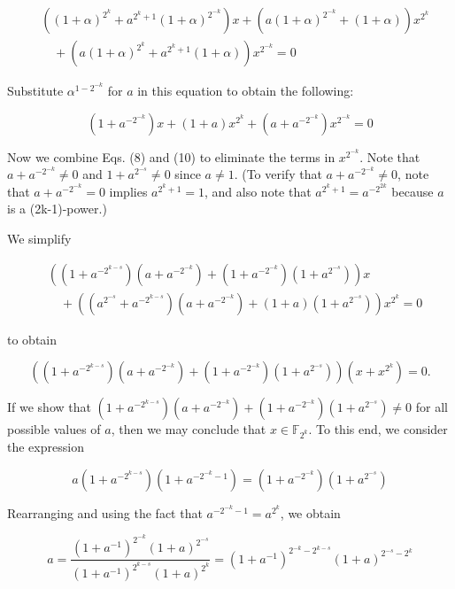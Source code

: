 \documentclass[10pt]{article}
\begin{document}
$$
\begin{aligned}
& \left((1+\alpha)^{2^{k}}+a^{2^{k}+1}(1+\alpha)^{2^{-k}}\right) x+\left(a(1+\alpha)^{2^{-k}}+(1+\alpha)\right) x^{2^{k}} \\
& \quad+\left(a(1+\alpha)^{2^{k}}+a^{2^{k}+1}(1+\alpha)\right) x^{2^{-k}}=0
\end{aligned}
$$

Substitute $\alpha^{1-2^{-k}}$ for $a$ in this equation to obtain the following:


\begin{equation*}
\left(1+a^{-2^{-k}}\right) x+(1+a) x^{2^{k}}+\left(a+a^{-2^{-k}}\right) x^{2^{-k}}=0 \tag{10}
\end{equation*}


Now we combine Eqs. (8) and (10) to eliminate the terms in $x^{2^{-k}}$. Note that $a+a^{-2^{-k}} \neq 0$ and $1+a^{2^{-s}} \neq 0$ since $a \neq 1$. (To verify that $a+a^{-2^{-k}} \neq 0$, note that $a+a^{-2^{-k}}=0$ implies $a^{2^{k}+1}=1$, and also note that $a^{2^{k}+1}=a^{-2^{2 k}}$ because $a$ is a (2k-1)-power.)

We simplify

$$
\begin{aligned}
& \left(\left(1+a^{-2^{k-s}}\right)\left(a+a^{-2^{-k}}\right)+\left(1+a^{-2^{-k}}\right)\left(1+a^{2^{-s}}\right)\right) x \\
& \quad+\left(\left(a^{2^{-s}}+a^{-2^{k-s}}\right)\left(a+a^{-2^{-k}}\right)+(1+a)\left(1+a^{2^{-s}}\right)\right) x^{2^{k}}=0
\end{aligned}
$$

to obtain

$$
\left(\left(1+a^{-2^{k-s}}\right)\left(a+a^{-2^{-k}}\right)+\left(1+a^{-2^{-k}}\right)\left(1+a^{2^{-s}}\right)\right)\left(x+x^{2^{k}}\right)=0 .
$$

If we show that $\left(1+a^{-2^{k-s}}\right)\left(a+a^{-2^{-k}}\right)+\left(1+a^{-2^{-k}}\right)\left(1+a^{2^{-s}}\right) \neq 0$ for all possible values of $a$, then we may conclude that $x \in \mathbb{F}_{2^{k}}$. To this end, we consider the expression

$$
a\left(1+a^{-2^{k-s}}\right)\left(1+a^{-2^{-k}-1}\right)=\left(1+a^{-2^{-k}}\right)\left(1+a^{2^{-s}}\right)
$$

Rearranging and using the fact that $a^{-2^{-k}-1}=a^{2^{k}}$, we obtain

$$
a=\frac{\left(1+a^{-1}\right)^{2^{-k}}(1+a)^{2^{-s}}}{\left(1+a^{-1}\right)^{2^{k-s}}(1+a)^{2^{k}}}=\left(1+a^{-1}\right)^{2^{-k}-2^{k-s}}(1+a)^{2^{-s}-2^{k}}
$$
\end{document}
